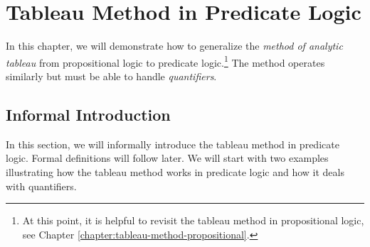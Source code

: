 \chapter{Tableau Method in Predicate Logic}

In this chapter, we will demonstrate how to generalize the \emph{method of analytic tableau} from propositional logic to predicate logic.\footnote{At this point, it is helpful to revisit the tableau method in propositional logic, see Chapter \ref{chapter:tableau-method-propositional}.} The method operates similarly but must be able to handle \emph{quantifiers}.

\section{Informal Introduction}

In this section, we will informally introduce the tableau method in predicate logic. Formal definitions will follow later. We will start with two examples illustrating how the tableau method works in predicate logic and how it deals with quantifiers.


